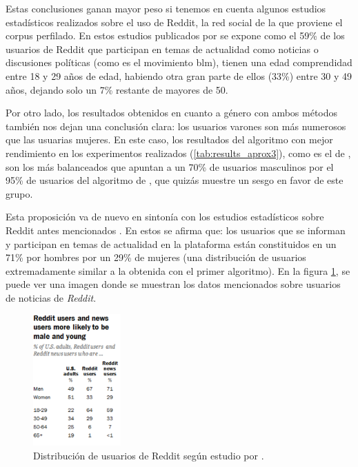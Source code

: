 Estas conclusiones ganan mayor peso si tenemos en cuenta algunos estudios estadísticos realizados sobre el uso de Reddit, la red social de la que proviene el corpus perfilado. En estos estudios publicados por \citet{reddit2016} se expone como el 59\% de los usuarios de Reddit que participan en temas de actualidad como noticias o discusiones políticas (como es el movimiento \acrshort{blm}), tienen una edad comprendidad entre 18 y 29 años de edad, habiendo otra gran parte de ellos (33\%) entre 30 y 49 años, dejando solo un 7\% restante de mayores de 50.

Por otro lado, los resultados obtenidos en cuanto a género con ambos métodos también nos dejan una conclusión clara: los usuarios varones son  más numerosos que las usuarias mujeres. En este caso, los resultados del algoritmo con mejor rendimiento en los experimentos realizados (\ref{tab:results_aprox3}), como es el de \citet{modaresi:2016}, son los más balanceados que apuntan a un 70\% de usuarios masculinos por el 95\% de usuarios del algoritmo de \citet{grivas2015author}, que quizás muestre un sesgo en favor de este grupo.

Esta proposición va de nuevo en sintonía con los estudios estadísticos sobre Reddit antes mencionados \citep{reddit2016}. En estos se afirma que: los usuarios que se informan y participan en temas de actualidad en la plataforma están constituidos en un 71\% por hombres por un 29\% de mujeres (una distribución de usuarios extremadamente similar a la obtenida con el primer algoritmo). En la figura \ref{fig:blm/estudio-estadistico}, se puede ver una imagen donde se muestran los datos mencionados sobre usuarios de noticias de \textit{Reddit}.

\begin{figure}[H]
  \centering
  \includegraphics[width=0.3\textwidth]{imaxes/estudio-reddit.pdf}
  \caption{Distribución de usuarios de Reddit según estudio por \citet{reddit2016}.}
  \label{fig:blm/estudio-estadistico}
\end{figure}

